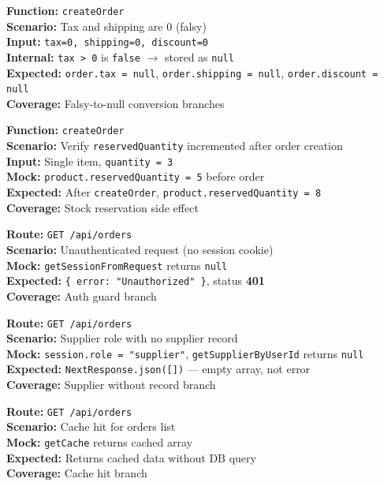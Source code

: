 \documentclass[12pt,onecolumn]{IEEEtran}
\begin{document}
\textbf{Function:} \texttt{createOrder} \\
\textbf{Scenario:} Tax and shipping are 0 (falsy) \\
\textbf{Input:} \texttt{tax=0, shipping=0, discount=0} \\
\textbf{Internal:} \texttt{tax > 0} is \texttt{false} $\to$ stored as \texttt{null} \\
\textbf{Expected:} \texttt{order.tax = null}, \texttt{order.shipping = null}, \texttt{order.discount = null} \\
\textbf{Coverage:} Falsy-to-null conversion branches



\textbf{Function:} \texttt{createOrder} \\
\textbf{Scenario:} Verify \texttt{reservedQuantity} incremented after order creation \\
\textbf{Input:} Single item, \texttt{quantity = 3} \\
\textbf{Mock:} \texttt{product.reservedQuantity = 5} before order \\
\textbf{Expected:} After \texttt{createOrder}, \texttt{product.reservedQuantity = 8} \\
\textbf{Coverage:} Stock reservation side effect



\textbf{Route:} \texttt{GET /api/orders} \\
\textbf{Scenario:} Unauthenticated request (no session cookie) \\
\textbf{Mock:} \texttt{getSessionFromRequest} returns \texttt{null} \\
\textbf{Expected:} \texttt{\{ error: "Unauthorized" \}}, status \textbf{401} \\
\textbf{Coverage:} Auth guard branch



\textbf{Route:} \texttt{GET /api/orders} \\
\textbf{Scenario:} Supplier role with no supplier record \\
\textbf{Mock:} \texttt{session.role = "supplier"}, \texttt{getSupplierByUserId} returns \texttt{null} \\
\textbf{Expected:} \texttt{NextResponse.json([])} --- empty array, not error \\
\textbf{Coverage:} Supplier without record branch



\textbf{Route:} \texttt{GET /api/orders} \\
\textbf{Scenario:} Cache hit for orders list \\
\textbf{Mock:} \texttt{getCache} returns cached array \\
\textbf{Expected:} Returns cached data without DB query \\
\textbf{Coverage:} Cache hit branch
\end{document}
